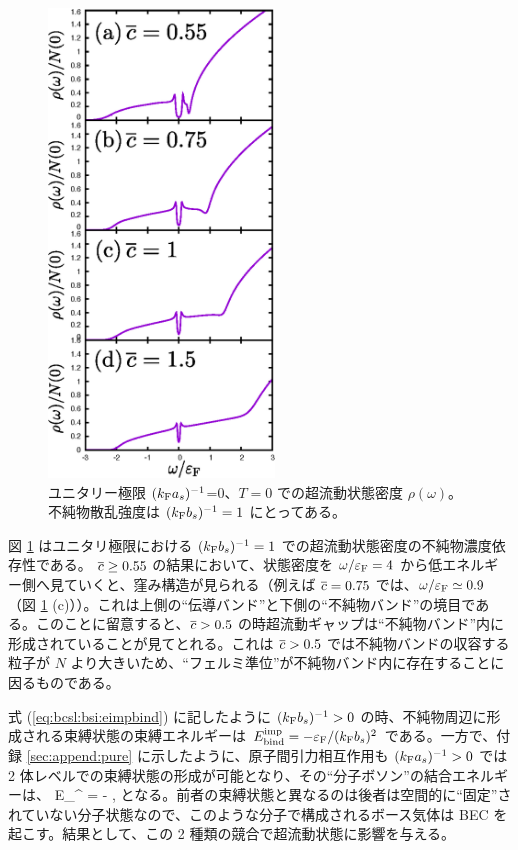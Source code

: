 \begin{figure}[t]
\centering
\includegraphics[width=60mm]{eps/bcsl-large-c.eps}
\caption{ユニタリー極限 $(k_{\text{F}} a_s)^{-1}$=0、$T=0$ での超流動状態密度 $\rho(\omega)$。不純物散乱強度は $(k_{\text{F}} b_s)^{-1}=1$ にとってある。}
\label{fig:bcsl:imp:large-c-dos}
\end{figure}

図 \ref{fig:bcsl:imp:large-c-dos} はユニタリ極限における $(k_{\text{F}} b_s)^{-1}=1$ での超流動状態密度の不純物濃度依存性である。 $\overline{c}\ge0.55$ の結果において、状態密度を $\omega/\varepsilon_{\text{F}} = 4$ から低エネルギー側へ見ていくと、窪み構造が見られる（例えば $\overline{c}=0.75$ では、$\omega/\varepsilon_{\text{F}}\simeq 0.9$ （図 \ref{fig:bcsl:imp:large-c-dos} (c)））。これは上側の“伝導バンド”と下側の“不純物バンド”の境目である。このことに留意すると、$\overline{c}>0.5$ の時超流動ギャップは“不純物バンド”内に形成されていることが見てとれる。これは $\overline{c} > 0.5$ では不純物バンドの収容する粒子が $N$ より大きいため、“フェルミ準位”が不純物バンド内に存在することに因るものである。



\label{sec:bcsl:bsi:iasvsibs}

式 (\ref{eq:bcsl:bsi:eimpbind}) に記したように $(k_{\text{F}} b_s)^{-1}>0$ の時、不純物周辺に形成される束縛状態の束縛エネルギーは $E^{\text{imp}}_{\text{bind}} = -\varepsilon_{\text{F}}/(k_{\text{F}} b_s)^2$ である。一方で、付録 \ref{sec:append:pure} に示したように、原子間引力相互作用も $(k_{\text{F}} a_s)^{-1}>0$ では 2 体レベルでの束縛状態の形成が可能となり、その“分子ボソン”の結合エネルギーは、
\beq
E_{}^{\as} = - ,\label{eq:bcsl:bsi:ebindas}
\eeq
となる。前者の束縛状態と異なるのは後者は空間的に“固定”されていない分子状態なので、このような分子で構成されるボース気体は BEC を起こす。結果として、この 2 種類の競合で超流動状態に影響を与える。

